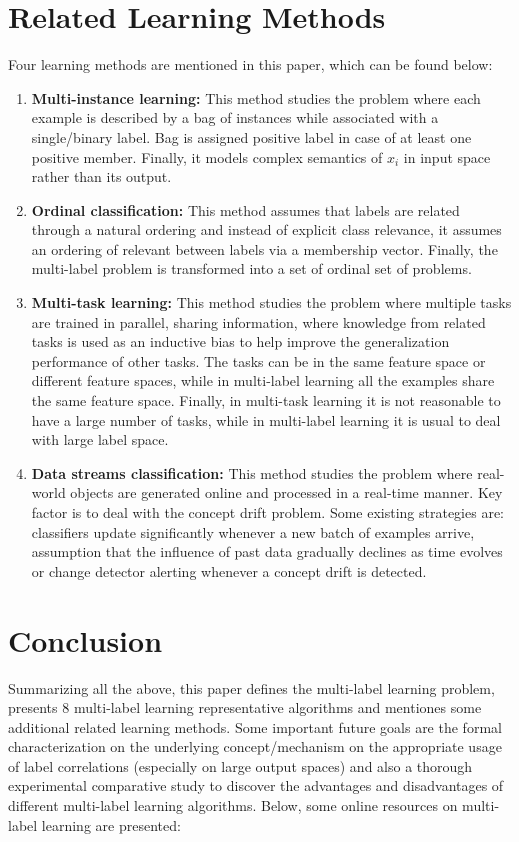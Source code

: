 \documentclass[12pt]{report}
\begin{document}
 	\section*{Related Learning Methods}
 	Four learning methods are mentioned in this paper, which can be found below:
 	\begin{enumerate}
 		\item \textbf{Multi-instance learning: }This method studies the problem where each example is described by a bag of instances while associated with a single/binary label. Bag is assigned positive label in case of at least one positive member. Finally, it models complex semantics of $x_i$ in input space rather than its output.
 		\item \textbf{Ordinal classification: }This method assumes that labels are related through a natural ordering and instead of explicit class relevance, it assumes an ordering of relevant between labels via a membership vector. Finally, the multi-label problem is transformed into a set of ordinal set of problems.
 		\item \textbf{Multi-task learning: }This method studies the problem where multiple tasks are trained in parallel, sharing information, where knowledge from related tasks is used as an inductive bias to help improve the generalization performance of other tasks. The  tasks can be in the same feature space or different feature spaces, while in multi-label learning all the examples share the same feature space. Finally, in multi-task learning it is not reasonable to have a large number of tasks, while in multi-label learning it is usual to deal with large label space.
 		\item \textbf{Data streams classification: }This method studies the problem	where real-world objects are generated online and processed in a real-time manner. Key factor is to deal with the concept drift problem. Some existing strategies are: classifiers update significantly whenever a new batch of examples arrive, assumption that the influence of past data gradually declines as time evolves or change detector alerting whenever a concept drift is detected.
 	\end{enumerate}
 	
	\section*{Conclusion}
	Summarizing all the above, this paper defines the multi-label learning problem, presents 8 multi-label learning representative algorithms and mentiones some additional related learning methods. Some important future goals are the formal characterization on the underlying concept/mechanism on the appropriate usage of label correlations (especially on large output spaces) and also a thorough experimental comparative study to discover the advantages and disadvantages of different multi-label learning algorithms. Below, some online resources on multi-label learning are presented:
	
\end{document}
